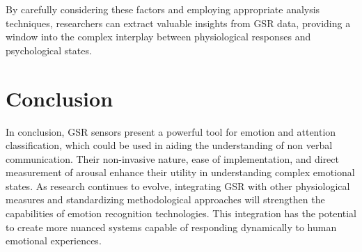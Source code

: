 \documentclass[twocolumn]{article}
\begin{document}
By carefully considering these factors and employing appropriate analysis techniques, researchers can extract valuable insights from GSR data, providing a window into the complex interplay between physiological responses and psychological states.\cite{Hernando-Gallego_Luengo_Artés-Rodríguez_2018}

\section{Conclusion}

In conclusion, GSR sensors present a powerful tool for emotion and attention classification, which could be used in aiding the understanding of non verbal communication. Their non-invasive nature, ease of implementation, and direct measurement of arousal enhance their utility in understanding complex emotional states. As research continues to evolve, integrating GSR with other physiological measures and standardizing methodological approaches will strengthen the capabilities of emotion recognition technologies. This integration has the potential to create more nuanced systems capable of responding dynamically to human emotional experiences.


\end{document}
